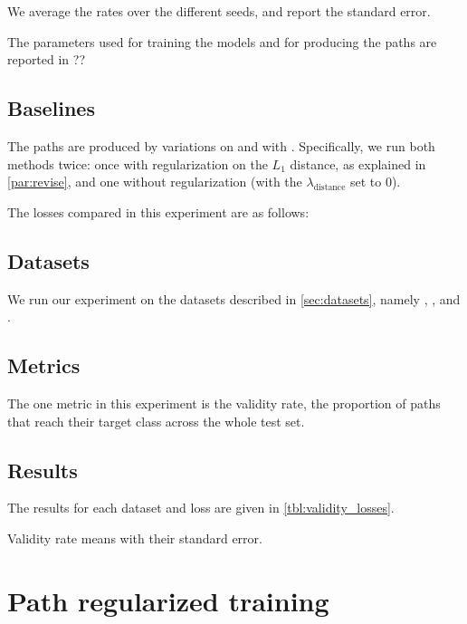 \documentclass[../main.tex]{subfiles}
\begin{document}
We average the rates over the different seeds, and report the standard error.

The parameters used for training the models and for producing the paths are reported in ?? 

\subsection{Baselines}

The paths are produced by variations on \ls{} and with \revise{}.
Specifically, we run both methods twice: once with regularization on the $L_1$ distance, as explained in \autoref{par:revise}, and one without regularization (with the $\lambda_\text{distance}$ set to 0).

The losses compared in this experiment are as follows:

\subsection{Datasets}

We run our experiment on the datasets described in \autoref{sec:datasets}, namely \CakeOnSea, \ForestCover, \WineQuality{} and \OnlineNewsPopularity.

\subsection{Metrics}

The one metric in this experiment is the validity rate, \ie{} the proportion of paths that reach their target class across the whole test set.

\subsection{Results}

The results for each dataset and loss are given in \autoref{tbl:validity_losses}.

\begin{table}[h!]
    \caption{Validity rate means with their standard error.}
\label{tbl:validity_losses}
    
\end{table}

\section{Path regularized training}
\end{document}
